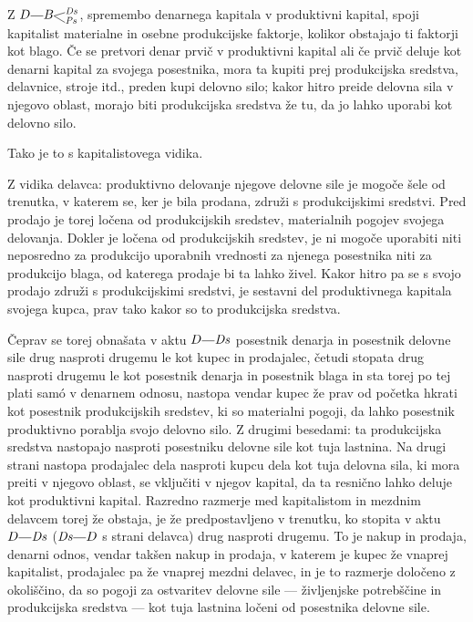 \documentclass[kapital_02.tex]{subfiles}
\begin{document}
Z \(\KPED\KPEcrta\KPEBrazcepDsPs\), spremembo denarnega kapitala v produktivni kapital, spoji kapitalist materialne in osebne produkcijske faktorje, kolikor obstajajo ti faktorji kot blago. Če se pretvori denar prvič v produktivni kapital ali če prvič deluje kot denarni kapital za svojega posestnika, mora ta kupiti prej produkcijska sredstva, delavnice, stroje itd., preden kupi delovno silo; kakor hitro preide delovna sila v njegovo oblast, morajo biti produkcijska sredstva že tu, da jo lahko uporabi kot delovno silo.

Tako je to s kapitalistovega vidika.

Z vidika delavca: produktivno delovanje njegove delovne sile je mogoče šele od trenutka, v katerem se, ker je bila prodana, združi s produkcijskimi sredstvi. Pred prodajo je torej ločena od produkcijskih sredstev, materialnih pogojev svojega delovanja. Dokler je ločena od produkcijskih sredstev, je ni mogoče uporabiti niti neposredno za produkcijo uporabnih vrednosti za njenega posestnika niti za produkcijo blaga, od katerega prodaje bi ta lahko živel. Kakor hitro pa se s svojo prodajo združi s produkcijskimi sredstvi, je sestavni del produktivnega kapitala svojega kupca, prav tako kakor so to produkcijska sredstva.

Čeprav se torej obnašata v aktu \(\KPED\KPEcrta\KPEDs\) posestnik denarja in posestnik delovne sile drug nasproti drugemu le kot kupec in prodajalec, četudi stopata drug nasproti drugemu le kot posestnik denarja in posestnik blaga in sta torej po tej plati sam\'o v denarnem odnosu, nastopa vendar kupec že prav od početka hkrati kot posestnik produkcijskih sredstev, ki so materialni pogoji, da lahko posestnik produktivno porablja svojo delovno silo. Z drugimi besedami: ta produkcijska sredstva nastopajo nasproti posestniku delovne sile kot tuja lastnina. Na drugi strani nastopa prodajalec dela nasproti kupcu dela kot tuja delovna sila, ki mora preiti v njegovo oblast, se vključiti v njegov kapital, da ta resnično lahko deluje kot produktivni kapital. Razredno razmerje med kapitalistom in mezdnim delavcem torej že obstaja, je že predpostavljeno v trenutku, ko stopita v aktu \(\KPED\KPEcrta\KPEDs\) (\(\KPEDs\KPEcrta\KPED\) s strani delavca) drug nasproti drugemu. To je nakup in prodaja, denarni odnos, vendar takšen nakup in prodaja, v katerem je kupec že vnaprej kapitalist, prodajalec pa že vnaprej mezdni delavec, in je to razmerje določeno z okoliščino, da so pogoji za ostvaritev delovne sile --- življenjske potrebščine in produkcijska sredstva --- kot tuja lastnina ločeni od posestnika delovne sile.
\end{document}
